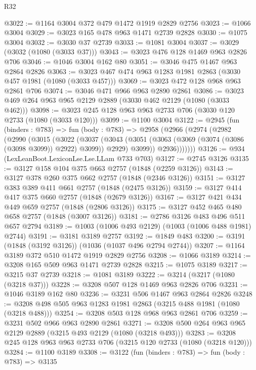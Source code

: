 \begin{lexlean}{R32}
\begin{coremodule}
@3022 := @1164 @3004 @372 @479 @1472 @1919 @2829 @2756
@3023 := @1066 @3004
@3029 := @3023 @165 @478 @963 @1471 @2739 @2828
@3030 := @1075 @3004
@3032 := @3030 @37 @2739
@3033 := @1081 @3004
@3037 := @3029 (@3032 (@1080 (@3033 @37)))
@3043 := @3023 @476 @128 @1469 @963 @2826 @706
@3046 := @1046 @3004 @162 @80
@3051 := @3046 @475 @1467 @963 @2864 @2826
@3063 := @3023 @467 @474 @963 @1283 @1981 @2863 (@3030 @457 @1981 (@1080 (@3033 @457)))
@3069 := @3023 @472 @128 @968 @963 @2861 @706
@3074 := @3046 @471 @966 @963 @2890 @2861
@3086 := @3023 @469 @264 @963 @965 @2129 @2889 (@3030 @462 @2129 (@1080 (@3033 @462)))
@3098 := @3023 @245 @128 @963 @963 @2733 @706 (@3030 @120 @2733 (@1080 (@3033 @120)))
@3099 := @1100 @3004
@3122 := @2945
    (fun (binders : @783) =>
    fun (body : @783) =>
    @2958
      (@2966
        (@2974
          (@2982
            (@2990
              (@3015
                (@3022
                  (@3037
                    (@3043
                      (@3051 (@3063 (@3069 (@3074 (@3086 (@3098 @3099)) @2922) @3099)) @2929)
                      @3099))
                  @2936)))))))
@3126 := @934 (LexLeanBoot.LexiconLse.Lse.LLam @733 @703)
@3127 := @2745 @3126
@3135 := @3127 @158 @104 @375 @663 @2757 (@1848 (@2259 @3126))
@3143 := @3127 @378 @260 @375 @662 @2757 (@1848 (@2346 @3126))
@3151 := @3127 @383 @389 @411 @661 @2757 (@1848 (@2475 @3126))
@3159 := @3127 @414 @417 @375 @660 @2757 (@1848 (@2679 @3126))
@3167 := @3127 @421 @434 @449 @659 @2757 (@1848 (@2806 @3126))
@3175 := @3127 @452 @465 @480 @658 @2757 (@1848 (@3007 @3126))
@3181 := @2786 @3126 @483 @496 @511 @657 @2794
@3189 := @1003 (@1006 @493 @2129) (@1003 (@1006 @488 @1981) @2744)
@3191 := @3181 @3189 @2757
@3192 := @1849 @483
@3200 := @3191 (@1848 (@3192 @3126)) (@1036 (@1037 @496 @2794 @2744))
@3207 := @1164 @3189 @372 @510 @1472 @1919 @2829 @2756
@3208 := @1066 @3189
@3214 := @3208 @165 @509 @963 @1471 @2739 @2828
@3215 := @1075 @3189
@3217 := @3215 @37 @2739
@3218 := @1081 @3189
@3222 := @3214 (@3217 (@1080 (@3218 @37)))
@3228 := @3208 @507 @128 @1469 @963 @2826 @706
@3231 := @1046 @3189 @162 @80
@3236 := @3231 @506 @1467 @963 @2864 @2826
@3248 := @3208 @498 @505 @963 @1283 @1981 @2863 (@3215 @488 @1981 (@1080 (@3218 @488)))
@3254 := @3208 @503 @128 @968 @963 @2861 @706
@3259 := @3231 @502 @966 @963 @2890 @2861
@3271 := @3208 @500 @264 @963 @965 @2129 @2889 (@3215 @493 @2129 (@1080 (@3218 @493)))
@3283 := @3208 @245 @128 @963 @963 @2733 @706 (@3215 @120 @2733 (@1080 (@3218 @120)))
@3284 := @1100 @3189
@3308 := @3122
    (fun (binders : @783) =>
    fun (body : @783) =>
    @3135

\end{coremodule}
\end{lexlean}
